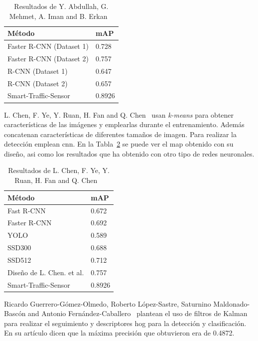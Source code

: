 \begin{table}[H] 
\begin{center}
\begin{tabular}{|l|l|}
\hline
Método & mAP  \\ 
\hline \hline
Faster R-CNN (Dataset 1) & 0.728  \\ \hline
Faster R-CNN (Dataset 2)  & 0.757 \\ \hline
R-CNN (Dataset 1) & 0.647  \\ \hline
R-CNN (Dataset 2)  & 0.657 \\ \hline
Smart-Traffic-Sensor & 0.8926 \\  \hline
\end{tabular}
\caption{Resultados de Y. Abdullah, G. Mehmet, A. Iman and B. Erkan ~\cite{rcnn_detection}}
\label{resultados_abdullah}
\end{center}
\end{table}

L. Chen, F. Ye, Y. Ruan, H. Fan and Q. Chen~\cite{l_chen} usan \textit{k-means} para obtener características de las imágenes y emplearlas durante el entrenamiento. Además concatenan características de diferentes tamaños de imagen. Para realizar la detección emplean \acrshort{cnn}. En la Tabla~\ref{resultados_lchen} se puede ver el \acrshort{map} obtenido con su diseño, asi como los resultados que ha obtenido con otro tipo de redes neuronales.

\begin{table}[H] 
\begin{center}
\begin{tabular}{|l|l|}
\hline
Método & mAP  \\ 
\hline \hline
Fast R-CNN & 0.672  \\ \hline
Faster R-CNN & 0.692 \\ \hline
YOLO & 0.589  \\ \hline
SSD300  & 0.688 \\ \hline
SSD512  & 0.712 \\ \hline
Diseño de L. Chen. et al. & 0.757 \\ \hline
Smart-Traffic-Sensor & 0.8926 \\  \hline
\end{tabular}
\caption{Resultados de L. Chen, F. Ye, Y. Ruan, H. Fan and Q. Chen ~\cite{l_chen}}
\label{resultados_lchen}
\end{center}
\end{table}

Ricardo Guerrero-Gómez-Olmedo, Roberto López-Sastre, Saturnino Maldonado-Bascón and Antonio Fernández-Caballero~\cite{gram-tracking} plantean el uso de filtros de Kalman para realizar el seguimiento y descriptores \acrshort{hog} para la detección y clasificación. En su artículo dicen que la máxima precisión que obtuvieron era de 0.4872.


